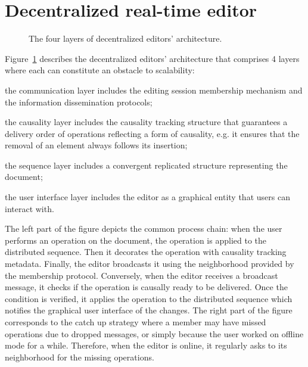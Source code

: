 
\section{Decentralized real-time editor}
\label{sec:editor}



\begin{figure}
  \centering
  
  \caption{\label{fig:architecture}The four layers of decentralized editors'
    architecture.}
\end{figure}


Figure~\ref{fig:architecture} describes the decentralized editors' architecture
that comprises 4 layers where each can constitute an obstacle to scalability:
\begin{inparaenum}[(i)]
\item the communication layer includes the editing session membership mechanism
  and the information dissemination protocols;
\item the causality layer includes the causality tracking structure that
  guarantees a delivery order of operations reflecting a form of causality,
  e.g. it ensures that the removal of an element always follows its insertion;
\item the sequence layer includes a convergent replicated structure representing
  the document;
\item the user interface layer includes the editor as a graphical entity that
  users can interact with. %
\end{inparaenum}

The left part of the figure depicts the common process chain: when the user
performs an operation on the document, the operation is applied to the
distributed sequence. Then it decorates the operation with causality tracking
metadata. Finally, the editor broadcasts it using the neighborhood provided by
the membership protocol.  Conversely, when the editor receives a broadcast
message, it checks if the operation is causally ready to be delivered. Once the
condition is verified, it applies the operation to the distributed sequence
which notifies the graphical user interface of the changes.  The right part of
the figure corresponds to the catch up strategy where a member may have missed
operations due to dropped messages, or simply because the user worked on offline
mode for a while. Therefore, when the editor is online, it regularly asks to its
neighborhood for the missing operations.

